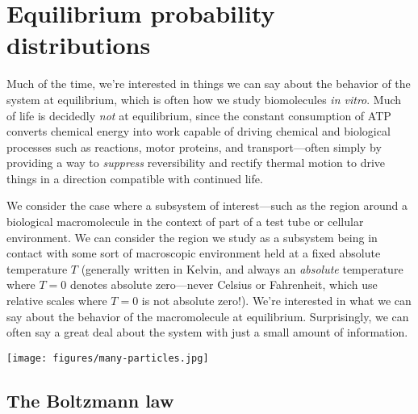 \documentclass[english,course]{lecture}
\begin{document}

\section{Equilibrium probability distributions} 

Much of the time, we're interested in things we can say about the behavior of the system at equilibrium, which is often how we study biomolecules \emph{in vitro}.
Much of life is decidedly \emph{not} at equilibrium, since the constant consumption of ATP converts chemical energy into work capable of driving chemical and biological processes such as reactions, motor proteins, and transport---often simply by providing a way to \emph{suppress} reversibility and rectify thermal motion to drive things in a direction compatible with continued life.

We consider the case where a subsystem of interest---such as the region around a biological macromolecule in the context of part of a test tube or cellular environment.
We can consider the region we study as a subsystem being in contact with some sort of macroscopic environment held at a fixed absolute temperature $T$ (generally written in Kelvin, and always an \emph{absolute} temperature where $T = 0$ denotes absolute zero---never Celsius or Fahrenheit, which use relative scales where $T = 0$ is not absolute zero!).
We're interested in what we can say about the behavior of the macromolecule at equilibrium.
Surprisingly, we can often say a great deal about the system with just a small amount of information.

\begin{centering}
\texttt{[image: figures/many-particles.jpg]}

\end{centering}


\subsection{The Boltzmann law} 
\end{document}
